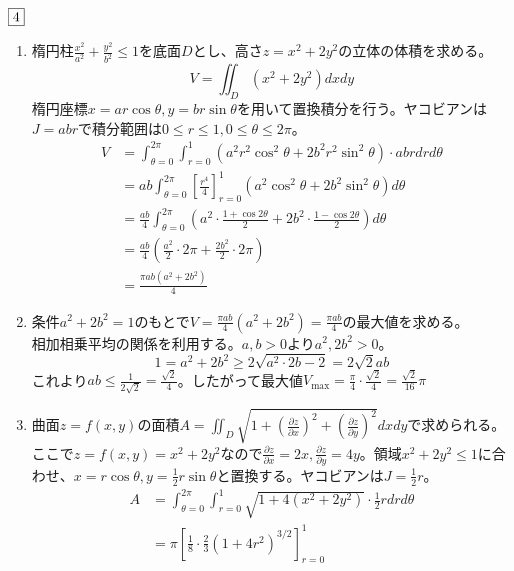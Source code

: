\begin{souanswer} %
	$\fbox{4}$
\begin{enumerate}
	\item 楕円柱$\frac{x^2}{a^2}+ \frac{y^2}{b^2}\le 1$を底面$D$とし、高さ$z= x^2+ 2y^2$の立体の体積を求める。
\begin{equation*}
    V= \iint_D (x^2+ 2y^2)dxdy
\end{equation*}
    楕円座標$x= ar\cos{\theta}, y= br\sin{\theta}$を用いて置換積分を行う。ヤコビアンは$J= abr$で積分範囲は$0\le r\le 1, 0\le \theta\le 2\pi$。
\begin{align*}
    V
    &= \int_{\theta= 0}^{2\pi}\int_{r= 0}^1 (a^2r^2\cos^2{\theta}+ 2b^2r^2\sin^2{\theta})\cdot abrdrd\theta\\
    &= ab\int_{\theta= 0}^{2\pi}\left[\frac{r^4}{4}\right]_{r= 0}^1(a^2\cos^2{\theta}+ 2b^2\sin^2{\theta})d\theta\\
    &= \frac{ab}{4}\int_{\theta= 0}^{2\pi}\left(a^2\cdot \frac{1+ \cos{2\theta}}{2}+ 2b^2\cdot \frac{1- \cos{2\theta}}{2}\right)d\theta\\
    &= \frac{ab}{4}\left(\frac{a^2}{2}\cdot 2\pi+ \frac{2b^2}{2}\cdot 2\pi\right)\\
    &= \frac{\pi ab(a^2+ 2b^2)}{4}
\end{align*}
    \item 条件$a^2+ 2b^2= 1$のもとで$V= \frac{\pi ab}{4}(a^2+ 2b^2)= \frac{\pi ab}{4}$の最大値を求める。\\
    相加相乗平均の関係を利用する。$a, b> 0$より$a^2, 2b^2> 0$。
\begin{equation*}
    1= a^2+ 2b^2\ge 2\sqrt{a^2\cdot 2b-2}= 2\sqrt{2}ab
\end{equation*}
    これより$ab\le \frac{1}{2\sqrt{2}}= \frac{\sqrt{2}}{4}$。したがって最大値$V_\mathrm{max}= \frac{\pi}{4}\cdot \frac{\sqrt{2}}{4}= \frac{\sqrt{2}}{16}\pi$
    \item 曲面$z= f(x, y)$の面積$A= \iint_D \sqrt{1+ \left(\frac{\partial z}{\partial x}\right)^2+ \left(\frac{\partial z}{\partial y}\right)^2}dxdy$で求められる。ここで$z= f(x, y)= x^2+ 2y^2$なので$\frac{\partial z}{\partial x}= 2x, \frac{\partial z}{\partial y}= 4y$。領域$x^2+ 2y^2\le 1$に合わせ、$x= r\cos{\theta}, y= \frac{1}{2}r\sin{\theta}$と置換する。ヤコビアンは$J= \frac{1}{2}r$。
\begin{align*}
    A
    &= \int_{\theta= 0}^{2\pi}\int_{r= 0}^1 \sqrt{1+ 4(x^2+ 2y^2)}\cdot \frac{1}{2}rdrd\theta\\
    &= \pi\left[\frac{1}{8}\cdot \frac{2}{3}(1+ 4r^2)^{3/2}\right]_{r= 0}^1\\

\end{align*}
\end{enumerate}
\end{souanswer}
